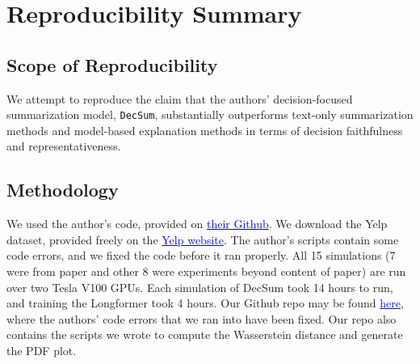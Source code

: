 \documentclass{article}
\title{}
\author{%
  Mingcheng Wang, Eric Xia, Trevor Jung\\ %
  University of Washington \\
 \texttt{\{wmingch, ericxia, tjung2\}@uw.edu} \\ %
}
\newcommand{\blue}[1]{\textcolor{blue}{#1}}
\begin{document}
\maketitle




\section*{\centering Reproducibility Summary}

\subsection*{Scope of Reproducibility}
We attempt to reproduce the claim that the authors’ decision-focused summarization model, \texttt{DecSum}, substantially outperforms text-only summarization methods and model-based
explanation methods in terms of decision faithfulness and representativeness.

\subsection*{Methodology}
We used the author’s code, provided on \href{https://github.com/ChicagoHAI/decsum}{\blue{their Github}}. We download the Yelp dataset, provided freely on the
\href{https://www.yelp.com/dataset/download}{\blue{Yelp website}}. The author's scripts contain some code errors, and we fixed the code before it ran properly. All 15 simulations (7 were from paper
and other 8 were experiments beyond content of paper) are run over two Tesla V100 GPUs. Each simulation of DecSum took 14 hours to run, and training the Longformer took 4 hours.
Our Github repo may be found \href{https://github.com/ericxiaseattle/CSE517-Project}{\blue{here}}, where the authors' code errors that we ran into have been fixed. Our repo also contains the scripts
we wrote to compute the Wasserstein distance and generate the PDF plot.
\end{document}
